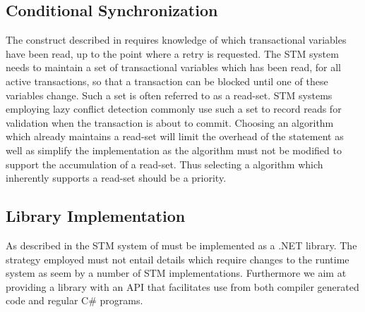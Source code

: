 \subsection{Conditional Synchronization}
\label{subsec:stm_impl_selection_conditional}
The  construct described in  requires knowledge of which transactional variables have been read, up to the point where a retry is requested\cite{harris2005composable}. The \ac{STM} system needs to maintain a set of transactional variables which has been read, for all active transactions, so that a transaction can be blocked until one of these variables change. Such a set is often referred to as a read-set\cite{dice2006transactional}\cite{harris2010transactional}\cite{herlihy2012art}. \ac{STM} systems employing lazy conflict detection commonly use such a set to record reads for validation when the transaction is about to commit\cite{dice2006transactional}\cite{mohamedin2013bytestm}. Choosing an algorithm which already maintains a read-set will limit the overhead of the  statement as well as simplify the implementation as the algorithm must not be modified to support the accumulation of a read-set. Thus selecting a algorithm which inherently supports a read-set should be a priority.

\subsection{Library Implementation}
As described in \bsref{} the \ac{STM} system of \stmnamesp must be implemented as a .NET library. The strategy employed must not entail details which require changes to the runtime system as seem by a number of \ac{STM} implementations\cite{mohamedin2013bytestm}\cite{harris2003language}. Furthermore we aim at providing a library with an \ac{API} that facilitates use from both compiler generated code and regular C\# programs.

